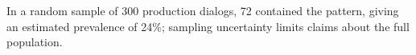 In a random sample of 300 production dialogs, 72 contained the pattern, giving an estimated prevalence of 24\%; sampling uncertainty limits claims about the full population.
